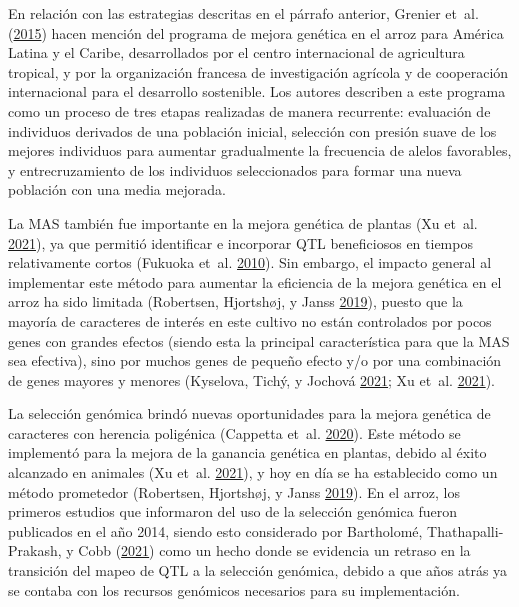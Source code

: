 \documentclass[11pt,spanish,a4paper,oneside,]{book} %
\begin{document}
En relación con las estrategias descritas en el párrafo anterior, Grenier et~al. (\protect\hyperlink{ref-cite:65}{2015}) hacen mención del programa de mejora genética en el arroz para América Latina y el Caribe, desarrollados por el centro internacional de agricultura tropical, y por la organización francesa de investigación agrícola y de cooperación internacional para el desarrollo sostenible. Los autores describen a este programa como un proceso de tres etapas realizadas de manera recurrente: evaluación de individuos derivados de una población inicial, selección con presión suave de los mejores individuos para aumentar gradualmente la frecuencia de alelos favorables, y entrecruzamiento de los individuos seleccionados para formar una nueva población con una media mejorada.

La MAS también fue importante en la mejora genética de plantas (Xu et~al. \protect\hyperlink{ref-cite:60}{2021}), ya que permitió identificar e incorporar QTL beneficiosos en tiempos relativamente cortos (Fukuoka et~al. \protect\hyperlink{ref-cite:61}{2010}). Sin embargo, el impacto general al implementar este método para aumentar la eficiencia de la mejora genética en el arroz ha sido limitada (Robertsen, Hjortshøj, y Janss \protect\hyperlink{ref-cite:63}{2019}), puesto que la mayoría de caracteres de interés en este cultivo no están controlados por pocos genes con grandes efectos (siendo esta la principal característica para que la MAS sea efectiva), sino por muchos genes de pequeño efecto y/o por una combinación de genes mayores y menores (Kyselova, Tichý, y Jochová \protect\hyperlink{ref-cite:32}{2021}; Xu et~al. \protect\hyperlink{ref-cite:60}{2021}).

La selección genómica brindó nuevas oportunidades para la mejora genética de caracteres con herencia poligénica (Cappetta et~al. \protect\hyperlink{ref-cite:64}{2020}). Este método se implementó para la mejora de la ganancia genética en plantas, debido al éxito alcanzado en animales (Xu et~al. \protect\hyperlink{ref-cite:60}{2021}), y hoy en día se ha establecido como un método prometedor (Robertsen, Hjortshøj, y Janss \protect\hyperlink{ref-cite:63}{2019}). En el arroz, los primeros estudios que informaron del uso de la selección genómica fueron publicados en el año 2014, siendo esto considerado por Bartholomé, Thathapalli-Prakash, y Cobb (\protect\hyperlink{ref-cite:58}{2021}) como un hecho donde se evidencia un retraso en la transición del mapeo de QTL a la selección genómica, debido a que años atrás ya se contaba con los recursos genómicos necesarios para su implementación.
\end{document}
